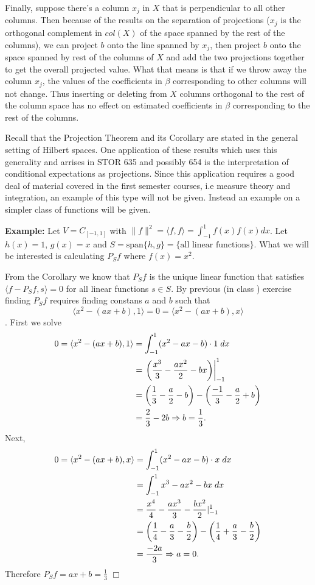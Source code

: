 \documentclass[12pt,oneside]{article}
\begin{document}
Finally, suppose there's a column $x_j$ in $X$ that is perpendicular to all
 other columns. Then because of the results on the separation of
 projections ($x_j$ is the orthogonal complement in $col(X)$ of the
 space spanned by the rest of the columns), we can project $b$ onto
 the line spanned by $x_j$, then project $b$ onto the space spanned by
 rest of the columns of $X$ and add the two projections together to
 get the overall projected value. What that means is that if we throw
 away the column $x_j$, the values of the coefficients in $\beta$
 corresponding to other columns will not change. Thus inserting or
 deleting from $X$ columns orthogonal to the rest of the column space
 has no effect on estimated coefficients in $\beta$ corresponding to
 the rest of the columns.
 
Recall that the Projection Theorem and its Corollary are stated in the general setting of Hilbert spaces. One application of these results which uses this generality and arrises in STOR 635 and possibly 654 is the interpretation of conditional expectations as projections. Since this application requires a good deal of material covered in the first semester courses, i.e measure theory and integration, an example of this type will not be given. Instead an example on a simpler class of functions will be given.

\textbf{Example:} Let \(V=C_{[-1,1]}\) with \(\|f\|^2= \langle f,f \rangle=\int_{-1}^1 f(x)f(x) dx\). Let \(h(x)=1\), \(g(x)=x\) and \(S=\text{span}\{h,g\}=\{\text{all linear functions}\}\). What we will be interested is calculating \(P_Sf\) where \(f(x)=x^2\).

From the Corollary we know that \(P_Sf\) is the unique linear function that satisfies \(\langle f-P_Sf,s \rangle=0\) for all linear functions \(s\in S\). By previous (in class ) exercise finding \(P_Sf\) requires finding constans \(a\) and \(b\) such that
\[\langle x^2-(ax+b),1 \rangle=0=\langle x^2-(ax+b),x \rangle\].
First we solve
\begin{align*}
0=\langle x^2-(ax+b),1 \rangle&=\int_{-1}^{1} (x^2-ax-b)\cdot 1 \hspace{1mm} dx\\
&=\left. \left(\frac{x^3}{3}-\frac{ax^2}{2}-bx\right)\right|_{-1}^{1}\\
&=\left(\frac{1}{3}-\frac{a}{2}-b\right)-\left(\frac{-1}{3}-\frac{a}{2}+b\right)\\
&=\frac{2}{3}-2b \Rightarrow b=\frac{1}{3}.
\end{align*}
Next, 
\begin{align*}
0=\langle x^2-(ax+b),x \rangle &=\int_{-1}^{1} (x^2-ax-b)\cdot x\hspace{1mm} dx\\
&=\int_{-1}^{1}x^3-ax^2-bx \hspace{1mm}dx\\
&=\frac{x^4}{4}-\frac{ax^3}{3}-\frac{bx^2}{2}|_{-1}^{1}\\
&=\left(\frac{1}{4}-\frac{a}{3}-\frac{b}{2}\right)-\left(\frac{1}{4}+\frac{a}{3}-\frac{b}{2}\right)\\
&=\frac{-2a}{3} \Rightarrow a=0.
\end{align*}
Therefore \(P_Sf=ax+b=\frac{1}{3}\)  \(\Box\)\\
\end{document}
